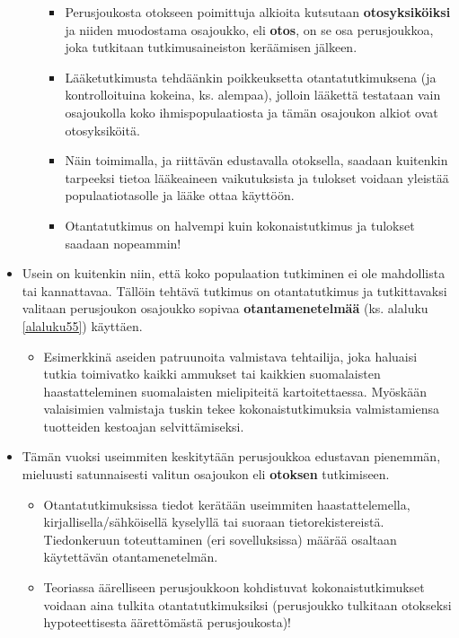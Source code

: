 \documentclass[
]{book}
\providecommand{\tightlist}{%
  \setlength{\itemsep}{0pt}\setlength{\parskip}{0pt}}
\begin{document}
\begin{itemize}
\begin{itemize}
    \begin{itemize}
    \tightlist
    \item
      Perusjoukosta otokseen poimittuja alkioita kutsutaan \textbf{otosyksiköiksi} ja niiden muodostama osajoukko, eli \textbf{otos}, on se osa perusjoukkoa, joka tutkitaan tutkimusaineiston keräämisen jälkeen.
    \item
      Lääketutkimusta tehdäänkin poikkeuksetta otantatutkimuksena (ja kontrolloituina kokeina, ks. alempaa), jolloin lääkettä testataan vain osajoukolla koko ihmispopulaatiosta ja tämän osajoukon alkiot ovat otosyksiköitä.
    \item
      Näin toimimalla, ja riittävän edustavalla otoksella, saadaan kuitenkin tarpeeksi tietoa lääkeaineen vaikutuksista ja tulokset voidaan yleistää populaatiotasolle ja lääke ottaa käyttöön.
    \item
      Otantatutkimus on halvempi kuin kokonaistutkimus ja tulokset saadaan nopeammin!
    \end{itemize}
  \end{itemize}
\item
  Usein on kuitenkin niin, että koko populaation tutkiminen ei ole mahdollista tai kannattavaa. Tällöin tehtävä tutkimus on otantatutkimus ja tutkittavaksi valitaan perusjoukon osajoukko sopivaa \textbf{otantamenetelmää} (ks. alaluku \ref{alaluku55}) käyttäen.

  \begin{itemize}
  \tightlist
  \item
    Esimerkkinä aseiden patruunoita valmistava tehtailija, joka haluaisi tutkia toimivatko kaikki ammukset tai kaikkien suomalaisten haastatteleminen suomalaisten mielipiteitä kartoitettaessa. Myöskään valaisimien valmistaja tuskin tekee kokonaistutkimuksia valmistamiensa tuotteiden kestoajan selvittämiseksi.
  \end{itemize}
\item
  Tämän vuoksi useimmiten keskitytään perusjoukkoa edustavan pienemmän, mieluusti satunnaisesti valitun osajoukon eli \textbf{otoksen} tutkimiseen.

  \begin{itemize}
  \tightlist
  \item
    Otantatutkimuksissa tiedot kerätään useimmiten haastattelemella, kirjallisella/sähköisellä kyselyllä tai suoraan tietorekistereistä. Tiedonkeruun toteuttaminen (eri sovelluksissa) määrää osaltaan käytettävän otantamenetelmän.
  \item
    Teoriassa äärelliseen perusjoukkoon kohdistuvat kokonaistutkimukset voidaan aina tulkita otantatutkimuksiksi (perusjoukko tulkitaan otokseksi hypoteettisesta äärettömästä perusjoukosta)!


\end{itemize}
\end{itemize}
\end{document}
